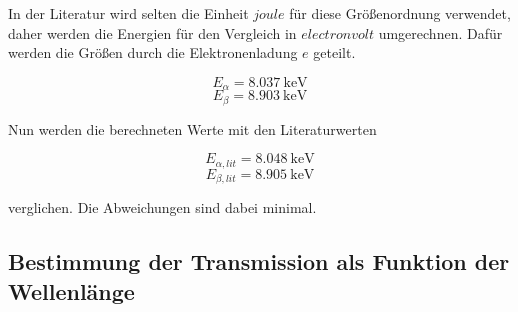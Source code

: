 In der Literatur wird selten die Einheit $\si{joule}$ für diese Größenordnung verwendet, daher werden die Energien für den Vergleich in $\si{electronvolt}$ umgerechnen.
Dafür werden die Größen durch die Elektronenladung $e$ geteilt.

\begin{equation}
    E_\alpha = \SI{8.037}{\kilo\electronvolt}
\end{equation}
\begin{equation}
    E_\beta = \SI{8.903}{\kilo\electronvolt}
\end{equation}

Nun werden die berechneten Werte mit den Literaturwerten

\begin{equation}
    E_{\alpha,lit} = \SI{8.048}{\kilo\electronvolt}
\end{equation}
\begin{equation}
    E_{\beta,lit} = \SI{8.905}{\kilo\electronvolt}
\end{equation}

verglichen. \cite{emissionslinien}
Die Abweichungen sind dabei minimal.

\subsection{Bestimmung der Transmission als Funktion der Wellenlänge}
\label{ssec:2}

